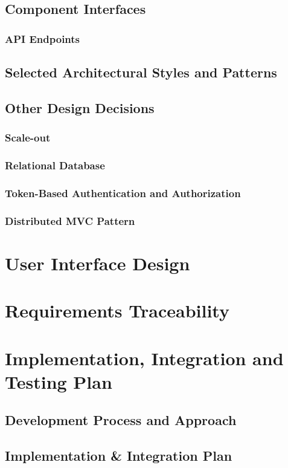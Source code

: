\documentclass[a4paper,12pt]{article}
\begin{document}
\subsection{Component Interfaces}
\subsubsection{API Endpoints}
\subsection{Selected Architectural Styles and Patterns}
\subsection{Other Design Decisions}
\subsubsection{Scale-out}
\subsubsection{Relational Database}
\subsubsection{Token-Based Authentication and Authorization}
\subsubsection{Distributed MVC Pattern}

\section{User Interface Design}

\section{Requirements Traceability}

\section{Implementation, Integration and Testing Plan}
\subsection{Development Process and Approach}
\subsection{Implementation \& Integration Plan}
\end{document}
